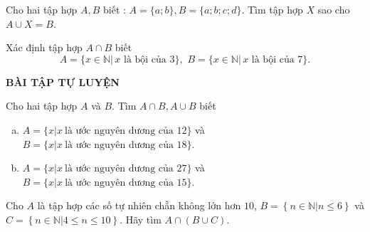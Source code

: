\begin{vd}%
	Cho hai tập hợp $A, B$ biết : $A=\{a;b\}, B=\{a;b;c;d\}$. Tìm tập hợp $X$ sao cho $A\cup X=B$.
\end{vd}
\begin{vd}%
	Xác định tập hợp $A\cap B$ biết 
	$$A=\{x\in\mathbb{N}|\, x \text { là bội của }3 \}, \,\, B=\{x\in\mathbb{N}|\, x\text { là bội của }7\}.$$
\end{vd}
\begin{center}
	\textbf{BÀI TẬP TỰ LUYỆN}
\end{center}
\begin{bt}%
	Cho hai tập hợp $A$ và $B$. Tìm $A\cap B, A\cup B$ biết
	\begin{enumerate}[a)]
		\item $A=\{x|x\ \text{là ước nguyên dương của 12} \}$ và 	$B=\{x|x\ \text{là ước nguyên dương của 18} \}$.
		\item $A=\{x|x\ \text{là ước nguyên dương của 27}\}$ và $B=\{x|x\ \text{là ước nguyên dương của 15} \}$.
	\end{enumerate}
\end{bt}

\begin{bt}%
	Cho $A$ là tập hợp các số tự nhiên chẵn không lớn hơn $10$, 
	$B=\left\{n\in \mathbb{N}|n\le 6\right\}$ và 
	$C=\left\{n\in \mathbb{N}|4\le n\le 10\right\}$. 
	Hãy tìm $A\cap (B\cup C)$.
\end{bt}

